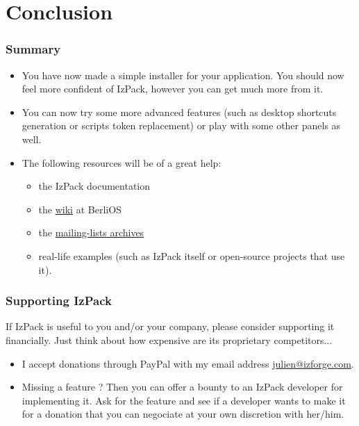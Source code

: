 \documentclass[compress,10pt]{beamer}
\begin{document}

\section{Conclusion}

\begin{frame}

\frametitle{Summary}

\begin{itemize}

  \item You have now made a simple installer for your application. You should
  now feel more confident of IzPack, however you can get much more from it.

  \item You can now try some more advanced features (such as desktop shortcuts
  generation or scripts token replacement) or play with some other panels as
  well.

  \item The following resources will be of a great help:
  \begin{itemize}

    \item the IzPack documentation

    \item the \href{http://openfacts.berlios.de/index-en.phtml?title=IzPack}{
    wiki} at BerliOS

    \item the \href{http://developer.berlios.de/mail/?group_id=1408}{
    mailing-lists archives}

    \item real-life examples (such as IzPack itself or open-source projects that
    use it).

  \end{itemize}

\end{itemize}

\end{frame}

\begin{frame}

\frametitle{Supporting IzPack}

If IzPack is useful to you and/or your company, please consider supporting it
financially. Just think about how expensive are its proprietary competitors...

\begin{itemize}

  \item I accept donations through PayPal with my email address
  \small{\url{julien@izforge.com}}.

  \item Missing a feature ? Then you can offer a bounty to an IzPack developer
  for implementing it. Ask for the feature and see if a developer wants to make
  it for a donation that you can negociate at your own discretion with her/him.

\end{itemize}

\end{frame}
\end{document}
